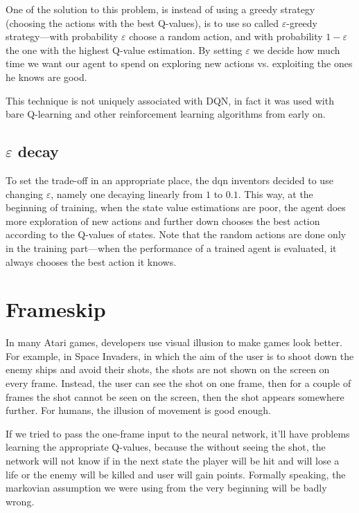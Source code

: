 One of the solution to this problem, is instead of using a greedy strategy (choosing the actions with the best Q-values), is to use so called $\varepsilon$-greedy strategy---with probability $\varepsilon$ choose a random action, and with probability $1 - \varepsilon$ the one with the highest Q-value estimation. By setting $\varepsilon$ we decide how much time we want our agent to spend on exploring new actions vs. exploiting the ones he knows are good.

This technique is not uniquely associated with DQN, in fact it was used with bare Q-learning and other reinforcement learning algorithms from early on.

\discussed

\subsection{$\varepsilon$ decay}
To set the trade-off in an appropriate place, the dqn inventors decided to use changing $\varepsilon$, namely one decaying linearly from $1$ to $0.1$. This way, at the beginning of training, when the state value estimations are poor, the agent does more exploration of new actions and further down chooses the best action according to the Q-values of states. Note that the random actions are done only in the training part---when the performance of a trained agent is evaluated, it always chooses the best action it knows.

\section{Frameskip}\label{dqn-frameskip}
In many Atari games, developers use visual illusion to make games look better. For example, in Space Invaders, in which the aim of the user is to shoot down the enemy ships and avoid their shots, the shots are not shown on the screen on every frame. Instead, the user can see the shot on one frame, then for a couple of frames the shot cannot be seen on the screen, then the shot appears somewhere further. For humans, the illusion of movement is good enough.

If we tried to pass the one-frame input to the neural network, it'll have problems learning the appropriate Q-values, because the without seeing the shot, the network will not know if in the next state the player will be hit and will lose a life or the enemy will be killed and user will gain points. Formally speaking, the markovian assumption we were using from the very beginning will be badly wrong.


